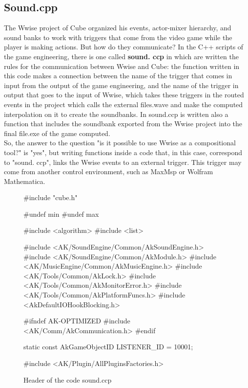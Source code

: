 		\subsection{Sound.cpp}
		The Wwise project of Cube organized his events, actor-mixer hierarchy, and sound banks to work with triggers that come from the video game while the player is making actions. But how do they communicate? In the C++ scripts of the game engineering, there is one called \textbf{sound. ccp} in which are written the rules for the communication between Wwise and Cube: the function written in this code makes a connection between the name of the trigger that comes in input from the output of the game engineering, and the name of the trigger in output that goes to the input of Wwise, which takes these triggers in the routed events in the project which calls the external files.wave and make the computed interpolation on it to create the soundbanks. In sound.ccp is written also a function that includes the soundbank exported from the Wwise project into the final file.exe of the game computed. \\
		So, the answer to the question "is it possible to use Wwise as a compositional tool?" is "yes", but writing functions inside a code that, in this case, correspond to "sound. ccp", links the Wwise events to an external trigger. This trigger may come from another control environment, such as MaxMsp or Wolfram Mathematica.
		
\begin{figure}[h]
	\begin{code}
#include "cube.h"
					
#undef min
#undef max
					
#include <algorithm>
#include <list>
					
#include <AK/SoundEngine/Common/AkSoundEngine.h>
#include <AK/SoundEngine/Common/AkModule.h>
#include <AK/MusicEngine/Common/AkMusicEngine.h>
#include <AK/Tools/Common/AkLock.h>
#include <AK/Tools/Common/AkMonitorError.h>
#include <AK/Tools/Common/AkPlatformFuncs.h>
#include <AkDefaultIOHookBlocking.h>
			
#ifndef AK-OPTIMIZED
#include <AK/Comm/AkCommunication.h>
#endif
					
static const AkGameObjectID LISTENER_ID = 10001;
					
#include <AK/Plugin/AllPluginsFactories.h>
	\end{code}
	\caption{Header of the code sound.ccp}
\end{figure}
	

